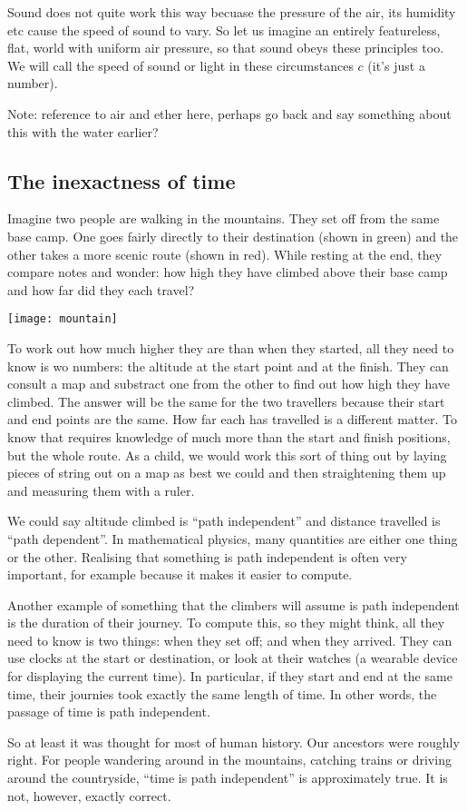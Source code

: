 \documentclass[a4paper]{report}
\begin{document}
Sound does not quite work this way becuase the pressure of the air, its humidity etc cause the speed of sound to vary. So let us imagine an entirely featureless, flat, world with uniform air pressure, so that sound obeys these principles too. We will call the speed of sound or light in these circumstances $c$ (it's just a number).

Note: reference to air and ether here, perhaps go back and say something about this with the water earlier?

\subsection*{The inexactness of time}
Imagine two people are walking in the mountains. They set off from the same base camp. One goes fairly directly to their destination (shown in green) and the other takes a more scenic route (shown in red). While resting at the end, they compare notes and wonder: how high they have climbed above their base camp and how far did they each travel?

\texttt{[image: mountain]}

To work out how much higher they are than when they started, all they need to know is wo numbers: the altitude at the start point and at the finish. They can consult a map and substract one from the other to find out how high they have climbed. The answer will be the same for the two travellers because their start and end points are the same. 
How far each has travelled is a different matter. To know that requires knowledge of much more than the start and finish positions, but the whole route. As a child, we would work this sort of thing out by laying pieces of string out on a map as best we could and then straightening them up and measuring them with a ruler. 

We could say altitude climbed is ``path independent'' and distance travelled is ``path dependent''. In mathematical physics, many quantities are either one thing or the other. Realising that something is path independent is often very important, for example  because it makes it easier to compute. 

Another example of something that the climbers will assume is path independent is the duration of their journey. To compute this, so they might think, all they need to know is two things: when they set off; and when they arrived. They can use clocks at the start or destination, or look at their watches (a wearable device for displaying the current time). In particular, if they start and end at the same time, their journies took exactly the same length of time. In other words, the passage of time is path independent.

So at least it was thought for most of human history. Our ancestors were roughly right. For people wandering around in the mountains, catching trains or driving around the countryside, ``time is path independent'' is approximately true. It is not, however, exactly correct. 
\end{document}
